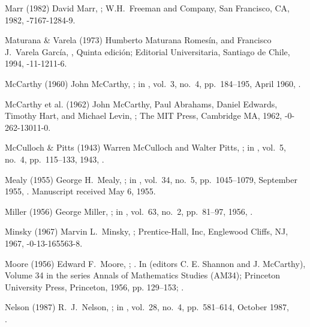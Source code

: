 \biblabel Marr (1982)
David Marr,
;
W.H.\ Freeman and Company, San Francisco, CA, 1982,
-7167-1284-9.

\biblabel Maturana \& Varela (1973)
Humberto Maturana Romesín, and
Francisco J.\ Varela García,
,
Quinta edición; Editorial Universitaria, Santiago de Chile, 1994,
-11-1211-6.

\biblabel McCarthy (1960)
John McCarthy,
;
in ,
vol.\ 3, no.\ 4, pp.\ 184--195, April 1960,
.

\biblabel McCarthy et al. (1962)
John McCarthy, Paul Abrahams, Daniel Edwards,
Timothy Hart, and Michael Levin,
 ;
The MIT Press, Cambridge MA, 1962,
-0-262-13011-0.

\biblabel McCulloch \& Pitts (1943)
Warren McCulloch and Walter Pitts,
;
in ,
vol.\ 5, no.\ 4, pp.\ 115--133, 1943,
.

\biblabel Mealy (1955)
George H.\ Mealy,
;
in ,
vol.\ 34, no.\ 5, pp.\ 1045--1079, September 1955,
.
Manuscript received May 6, 1955.

\biblabel Miller (1956)
George Miller,
;
in ,
vol.\ 63, no.\ 2, pp.\ 81--97, 1956,
.

\biblabel Minsky (1967)
Marvin L.\ Minsky,
;
Prentice-Hall, Inc, Englewood Cliffs, NJ, 1967,
-0-13-165563-8.

\biblabel Moore (1956)
Edward F.\ Moore,
;
.
In 
(editors C. E. Shannon and J. McCarthy),
Volume 34 in the series Annals of Mathematics Studies (AM34);
Princeton University Press, Princeton, 1956, pp. 129--153;
.

\biblabel Nelson (1987)
R.\ J.\ Nelson,
;
in ,
vol.\ 28, no.\ 4, pp.\ 581--614, October 1987,\\
.


